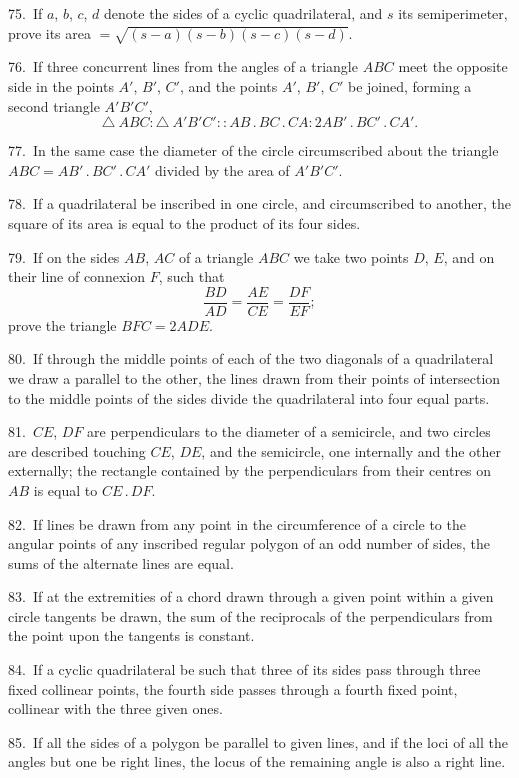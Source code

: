 \documentclass[oneside]{book}
\begin{document}
\begin{footnotesize}
75.~If $a$, $b$, $c$, $d$ denote the sides of a cyclic quadrilateral, and $s$
its semiperimeter, prove its area $= \sqrt{(s-a)(s-b)(s-c)(s-d)}$.

76.~If three concurrent lines from the angles of a triangle $ABC$
meet the opposite side in the points $A'$, $B'$, $C'$, and the points
$A'$, $B'$, $C'$ be joined, forming a second triangle $A'B'C'$,
\[
\triangle\ ABC : \triangle\ A'B'C' :: AB\,.\,BC\,.\,CA : 2AB'\,.\,BC'\,.\,CA'.
\]

77.~In the same case the diameter of the circle circumscribed
about the triangle $ABC = AB'\,.\,BC'\,.\,CA'$ divided by the area of
$A'B'C'$.

78.~If a quadrilateral be inscribed in one circle, and circumscribed
to another, the square of its area is equal to the product
of its four sides.

79.~If on the sides $AB$, $AC$ of a triangle $ABC$ we take two
points $D$, $E$, and on their line of connexion $F$, such that
\[
\frac{BD}{AD}=\frac{AE}{CE}=\frac{DF}{EF};
\]
prove the triangle $BFC=2ADE$.

80.~If through the middle points of each of the two diagonals
of a quadrilateral we draw a parallel to the other, the lines drawn
from their points of intersection to the middle points of the sides
divide the quadrilateral into four equal parts.

81.~$CE$, $DF$ are perpendiculars to the diameter of a semicircle,
and two circles are described touching $CE$, $DE$, and the semicircle,
one internally and the other externally; the rectangle contained by
the perpendiculars from their centres on $AB$ is equal to $CE\,.\,DF$.

82.~If lines be drawn from any point in the circumference of a
circle to the angular points of any inscribed regular polygon of an
odd number of sides, the sums of the alternate lines are equal.

83.~If at the extremities of a chord drawn through a given
point within a given circle tangents be drawn, the sum of the
reciprocals of the perpendiculars from the point upon the tangents
is constant.

84.~If a cyclic quadrilateral be such that three of its sides pass
through three fixed collinear points, the fourth side passes through
a fourth fixed point, collinear with the three given ones.

85.~If all the sides of a polygon be parallel to given lines, and
if the loci of all the angles but one be right lines, the locus of the
remaining angle is also a right line.


\end{footnotesize}
\end{document}

